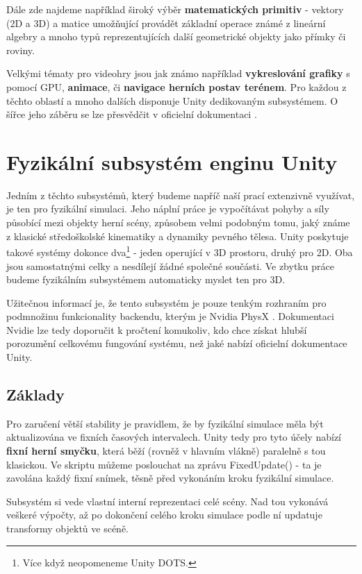 Dále zde najdeme například široký výběr \textbf{matematických primitiv} - vektory (2D a 3D) a matice umožňující provádět základní operace známé z lineární algebry a mnoho typů reprezentujících další geometrické objekty jako přímky či roviny.

Velkými tématy pro videohry jsou jak známo například \textbf{vykreslování grafiky} s pomocí GPU, \textbf{animace}, či \textbf{navigace herních postav terénem}. Pro každou z těchto oblastí a mnoho dalších disponuje Unity dedikovaným subsystémem. O šířce jeho záběru se lze přesvědčit v oficielní dokumentaci \cite{Unity}.

\section{Fyzikální subsystém enginu Unity}

Jedním z těchto subsystémů, který budeme napříč naší prací extenzivně využívat, je ten pro fyzikální simulaci. Jeho náplní práce je vypočítávat pohyby a síly působící mezi objekty herní scény, způsobem velmi podobným tomu, jaký známe z klasické středoškolské kinematiky a dynamiky pevného tělesa. Unity poskytuje takové systémy dokonce dva\footnote{Více když neopomeneme Unity DOTS.} - jeden operující v 3D prostoru, druhý pro 2D. Oba jsou samostatnými celky a nesdílejí žádné společné součásti. Ve zbytku práce budeme fyzikálním subsystémem automaticky myslet ten pro 3D.   

Užitečnou informací je, že tento subsystém je pouze tenkým rozhraním pro podmnožinu funkcionality backendu, kterým je Nvidia PhysX \cite{PhysX}. Dokumentaci Nvidie \cite{PhysX} lze tedy doporučit k pročtení komukoliv, kdo chce získat hlubší porozumění celkovému fungování systému, než jaké nabízí oficielní dokumentace Unity.

\subsection{Základy}

Pro zaručení větší stability je pravidlem, že by fyzikální simulace měla být aktualizována ve fixních časových intervalech. Unity tedy pro tyto účely nabízí \textbf{fixní herní smyčku}, která běží (rovněž v hlavním vlákně) paralelně s tou klasickou. Ve skriptu můžeme poslouchat na zprávu FixedUpdate() - ta je zavolána každý fixní snímek, těsně před vykonáním kroku fyzikální simulace. 

Subsystém si vede vlastní interní reprezentaci celé scény. Nad tou vykonává veškeré výpočty, až po dokončení celého kroku simulace podle ní updatuje transformy objektů ve scéně. 

